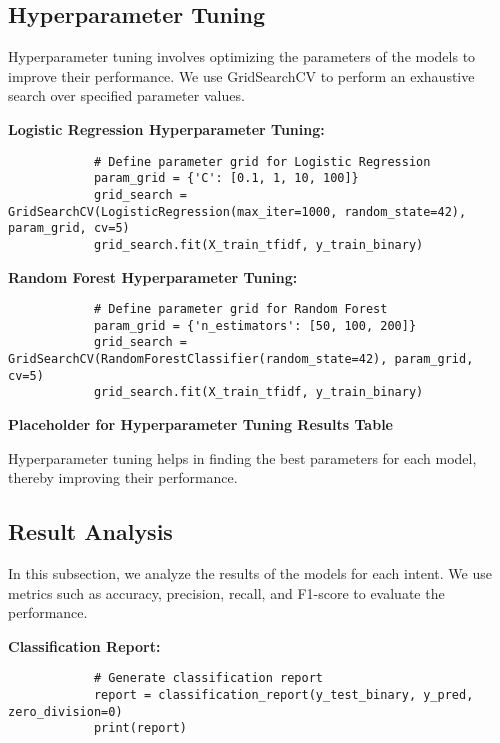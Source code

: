     \subsection{Hyperparameter Tuning}
    
        Hyperparameter tuning involves optimizing the parameters of the models to improve their performance. We use GridSearchCV to perform an exhaustive search over specified parameter values.

        \textbf{Logistic Regression Hyperparameter Tuning:}

        \begin{verbatim}
            # Define parameter grid for Logistic Regression
            param_grid = {'C': [0.1, 1, 10, 100]}
            grid_search = GridSearchCV(LogisticRegression(max_iter=1000, random_state=42), param_grid, cv=5)
            grid_search.fit(X_train_tfidf, y_train_binary)
        \end{verbatim}

        \textbf{Random Forest Hyperparameter Tuning:}

        \begin{verbatim}
            # Define parameter grid for Random Forest
            param_grid = {'n_estimators': [50, 100, 200]}
            grid_search = GridSearchCV(RandomForestClassifier(random_state=42), param_grid, cv=5)
            grid_search.fit(X_train_tfidf, y_train_binary)
        \end{verbatim}

        \textbf{Placeholder for Hyperparameter Tuning Results Table}

        Hyperparameter tuning helps in finding the best parameters for each model, thereby improving their performance.
            
    \subsection{Result Analysis}
    
        In this subsection, we analyze the results of the models for each intent. We use metrics such as accuracy, precision, recall, and F1-score to evaluate the performance.

        \textbf{Classification Report:}

        \begin{verbatim}
            # Generate classification report
            report = classification_report(y_test_binary, y_pred, zero_division=0)
            print(report)
        \end{verbatim}

